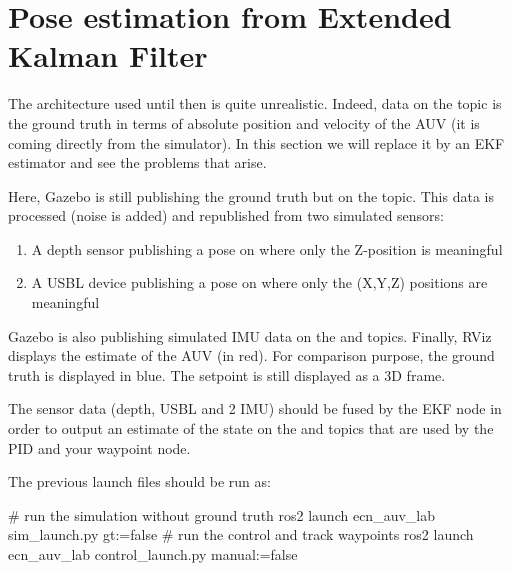 \documentclass{ecnreport}
\begin{document}
%

\section{Pose estimation from Extended Kalman Filter}

The architecture used until then is quite unrealistic.
Indeed, data on the topic  is the ground truth in terms of absolute position and velocity of the AUV (it is coming
directly from the simulator).
In this section we will replace it by an EKF estimator and see the problems that arise.

Here, Gazebo is still publishing the ground truth but on the  topic. This data is processed (noise is added) and republished from two simulated sensors:
\begin{enumerate}
  \item A depth sensor publishing a pose on  where only the Z-position is meaningful
  \item A USBL device publishing a pose on  where only the (X,Y,Z) positions are meaningful
\end{enumerate}
Gazebo is also publishing simulated IMU data on the  and  topics.
Finally, RViz displays the estimate of the AUV (in red).
For comparison purpose, the ground truth is displayed in blue. The setpoint is still displayed as a 3D frame.

The sensor data (depth, USBL and 2 IMU) should be fused by the EKF node in order to output an estimate of the state on the  and  topics that are used by the PID and your waypoint node.

The previous launch files should be run as:
\begin{bashcodelarge}
# run the simulation without ground truth
ros2 launch ecn_auv_lab sim_launch.py gt:=false
# run the control and track waypoints
ros2 launch ecn_auv_lab control_launch.py manual:=false
 \end{bashcodelarge}
\end{document}
